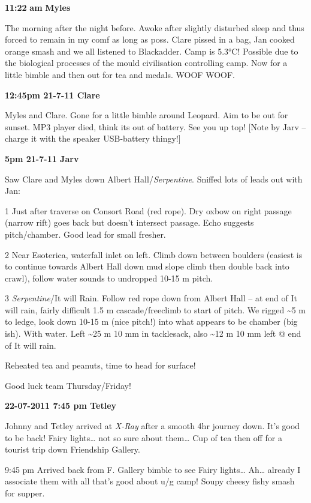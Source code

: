 \textbf{11:22} \textbf{am} \textbf{Myles}

The morning after the night before. Awoke after slightly disturbed sleep
and thus forced to remain in my comf as long as poss. Clare pissed in a
bag, Jan cooked orange smash and we all listened to Blackadder. Camp is
5.3°C! Possible due to the biological processes of the mould
civilisation controlling camp. Now for a little bimble and then out for
tea and medals. WOOF WOOF.

\textbf{12:45pm 21-7-11 Clare}

Myles and Clare. Gone for a little bimble around Leopard. Aim to be out
for sunset. MP3 player died, think its out of battery. See you up top!
{[}Note by Jarv -- charge it with the speaker USB-battery thingy!{]}

\textbf{5pm 21-7-11 Jarv}

Saw Clare and Myles down Albert Hall/\emph{Serpentine}. Sniffed lots of
leads out with Jan:

1 Just after traverse on Consort Road (red rope). Dry oxbow on right
passage (narrow rift) goes back but doesn't intersect passage. Echo
suggests pitch/chamber. Good lead for small fresher.

2 Near Esoterica, waterfall inlet on left. Climb down between boulders
(easiest is to continue towards Albert Hall down mud slope climb then
double back into crawl), follow water sounds to undropped 10-15 m pitch.

3 \emph{Serpentine}/It will Rain. Follow red rope down from Albert Hall
-- at end of It will rain, fairly difficult 1.5 m cascade/freeclimb to
start of pitch. We rigged \textasciitilde 5 m to ledge, look down 10-15
m (nice pitch!) into what appears to be chamber (big ish). With water.
Left \textasciitilde 25 m 10 mm in tacklesack, also \textasciitilde 12 m
10 mm left @ end of It will rain.

Reheated tea and peanuts, time to head for surface!

Good luck team Thursday/Friday!

\textbf{22-07-2011 7:45 pm Tetley}

Johnny and Tetley arrived at \emph{X-Ray} after a smooth 4hr journey
down. It's good to be back! Fairy lights\ldots{} not so sure about
them\ldots{} Cup of tea then off for a tourist trip down Friendship
Gallery.

9:45 pm Arrived back from F. Gallery bimble to see Fairy lights\ldots{}
Ah\ldots{} already I associate them with all that's good about u/g camp!
Soupy cheesy fishy smash for supper.

